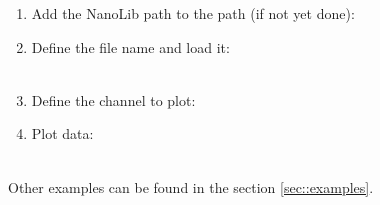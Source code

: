 \begin{enumerate}
	\item Add the NanoLib path to the \matlab{} path (if not yet done):\\

	\item Define the file name and load it:\\
	\\
	
	\item Define the channel to plot:\\

	\item Plot data:\\
	\\
	
\end{enumerate}

\noindent Other examples can be found in the section \ref{sec::examples}.
